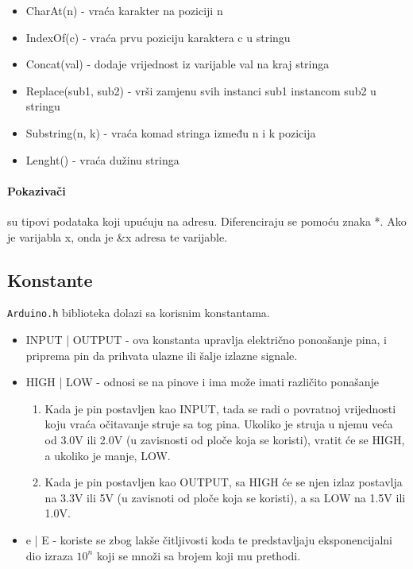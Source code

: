\documentclass[../Document.tex]{subfiles}
\begin{document}
\begin{itemize}
  \item CharAt(n) - vraća karakter na poziciji n
  \item IndexOf(c) - vraća prvu poziciju karaktera c u stringu
  \item Concat(val) - dodaje vrijednost iz varijable val na kraj stringa
  \item Replace(sub1, sub2) - vrši zamjenu svih instanci sub1 instancom sub2 u stringu
  \item Substring(n, k) - vraća komad stringa između n i k pozicija
  \item Lenght() - vraća dužinu stringa
\end{itemize}

\paragraph{Pokazivači} su tipovi podataka koji upućuju na adresu. Diferenciraju se pomoću znaka *. Ako je varijabla x, onda je \&x adresa te varijable.

\subsection{Konstante}

\verb|Arduino.h| biblioteka dolazi sa korisnim konstantama.

\begin{itemize}
  \item INPUT | OUTPUT - ova konstanta upravlja električno ponoašanje pina, i priprema pin da prihvata ulazne ili šalje izlazne signale.
  \item HIGH | LOW - odnosi se na pinove i ima može imati različito ponašanje
        \begin{enumerate}
          \item Kada je pin postavljen kao INPUT, tada se radi o povratnoj vrijednosti koju vraća očitavanje struje sa tog pina. Ukoliko je struja u njemu veća od 3.0V ili 2.0V (u zavisnosti od ploče koja se koristi), vratit će se HIGH, a ukoliko je manje, LOW.
          \item Kada je pin postavljen kao OUTPUT, sa HIGH će se njen izlaz postavlja na 3.3V ili 5V (u zavisnoti od ploče koja se koristi), a sa LOW na 1.5V ili 1.0V.
        \end{enumerate}
  \item e | E - koriste se zbog lakše čitljivosti koda te predstavljaju eksponencijalni dio izraza $10^n$ koji se množi sa brojem koji mu prethodi.
\end{itemize}
\end{document}
